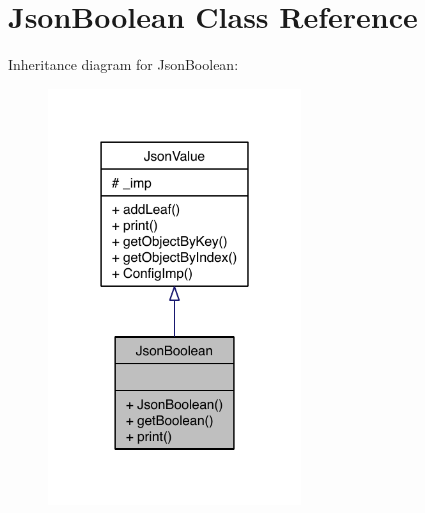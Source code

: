 \hypertarget{class_json_boolean}{\section{Json\-Boolean Class Reference}
\label{class_json_boolean}
}


Inheritance diagram for Json\-Boolean\-:
\nopagebreak
\begin{figure}[H]
\begin{center}
\leavevmode
\includegraphics[width=190pt]{class_json_boolean__inherit__graph}
\end{center}
\end{figure}


